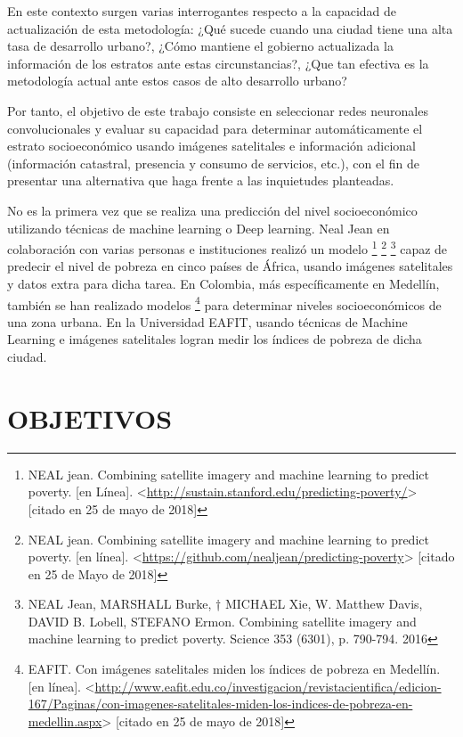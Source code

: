 En este contexto surgen varias interrogantes respecto a la capacidad de actualización de esta metodología: ¿Qué sucede cuando una ciudad tiene una alta tasa de desarrollo urbano?, ¿Cómo mantiene el gobierno actualizada la información de los estratos ante estas circunstancias?, ¿Que tan efectiva es la metodología actual ante estos casos de alto desarrollo urbano?
   
Por tanto, el objetivo de este trabajo consiste en seleccionar redes neuronales convolucionales y evaluar su capacidad para determinar automáticamente el estrato socioeconómico usando imágenes satelitales e información adicional (información catastral, presencia y consumo de servicios, etc.), con el fin de presentar una alternativa que haga frente a las inquietudes planteadas.
    
No es la primera vez que se realiza una predicción del nivel socioeconómico utilizando técnicas de machine learning o Deep learning. Neal Jean en colaboración con varias personas e instituciones realizó un modelo \footnote{NEAL jean. Combining satellite imagery and machine learning to predict poverty. [en Línea]. <\url{http://sustain.stanford.edu/predicting-poverty/}> [citado en 25 de mayo de 2018]} \footnote{NEAL jean. Combining satellite imagery and machine learning to predict poverty. [en línea]. <\url{https://github.com/nealjean/predicting-poverty}> [citado en 25 de Mayo de 2018]} \footnote{NEAL Jean, MARSHALL Burke, † MICHAEL Xie, W. Matthew Davis, DAVID B. Lobell, STEFANO Ermon. Combining satellite imagery and machine learning to predict poverty. Science 353 (6301), p. 790-794. 2016} capaz de predecir el nivel de pobreza en cinco países de África, usando imágenes satelitales y datos extra para dicha tarea. En Colombia, más específicamente en Medellín, también se han realizado modelos \footnote{EAFIT. Con imágenes satelitales miden los índices de pobreza en Medellín. [en línea]. <\url{http://www.eafit.edu.co/investigacion/revistacientifica/edicion-167/Paginas/con-imagenes-satelitales-miden-los-indices-de-pobreza-en-medellin.aspx}> [citado en 25 de mayo de 2018]} para determinar niveles socioeconómicos de una zona urbana. En la Universidad EAFIT, usando técnicas de Machine Learning e imágenes satelitales logran medir los índices de pobreza de dicha ciudad.
    
    
    
    
\newpage\chapter{OBJETIVOS} 

